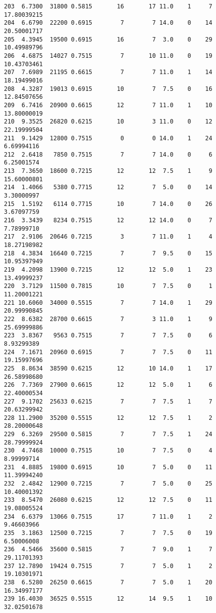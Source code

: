 \documentclass[
  letterpaper,
  DIV=11,
  numbers=noendperiod]{scrreprt}
\begin{document}
\begin{verbatim}
203  6.7300  31800 0.5815       16       17 11.0    1     7 17.80039215
204  6.6790  22200 0.6915        7        7 14.0    0    14 20.50001717
205  4.3945  19500 0.6915       16        7  3.0    0    29 10.49989796
206  4.6875  14027 0.7515        7       10 11.0    0    19 10.43703461
207  7.6989  21195 0.6615        7        7 11.0    1    14 18.19499016
208  4.3287  19013 0.6915       10        7  7.5    0    16 12.84507656
209  6.7416  20900 0.6615       12        7 11.0    1    10 13.80000019
210  9.3525  26820 0.6215       10        3 11.0    0    12 22.19999504
211  9.1429  12800 0.7515        0        0 14.0    1    24  6.69994116
212  2.6418   7850 0.7515        7        7 14.0    0     6  6.25001574
213  7.3650  18600 0.7215       12       12  7.5    1     9 15.60000801
214  1.4066   5380 0.7715       12        7  5.0    0    14  3.30000997
215  1.5192   6114 0.7715       10        7 14.0    0    26  3.67097759
216  3.3439   8234 0.7515       12       12 14.0    0     7  7.78999710
217  2.9106  20646 0.7215        3        7 11.0    1     4 18.27198982
218  4.3834  16640 0.7215        7        7  9.5    0    15 10.95397949
219  4.2098  13900 0.7215       12       12  5.0    1    23 13.49999237
220  3.7129  11500 0.7815       10        7  7.5    0     1 11.20001221
221 10.6060  34000 0.5515        7        7 14.0    1    29 20.99990845
222  8.6382  28700 0.6615        7        3 11.0    1     9 25.69999886
223  3.8367   9563 0.7515        7        7  7.5    0     6  8.93299389
224  7.1671  20960 0.6915        7        7  7.5    0    11 19.15997696
225  8.8634  38590 0.6215       12       10 14.0    1    17 26.58998680
226  7.7369  27900 0.6615       12       12  5.0    1     6 22.40000534
227  9.1702  25633 0.6215        7        7  7.5    1     7 20.63299942
228 11.2900  35200 0.5515       12       12  7.5    1     2 28.20000648
229  6.3269  29500 0.5815        7        7  7.5    1    24 28.79999924
230  4.7468  10000 0.7515       10        7  7.5    0     4  8.99999714
231  4.8885  19800 0.6915       10        7  5.0    0    11 11.39994240
232  2.4842  12900 0.7215        7        7  5.0    0    25 10.40001392
233  8.5470  26080 0.6215       12       12  7.5    0    11 19.08005524
234  6.6379  13066 0.7515       17        7 11.0    1     2  9.46603966
235  3.1863  12500 0.7215        7        7  7.5    0    19  6.50006008
236  4.5466  35600 0.5815        7        7  9.0    1     7 29.11701393
237 12.7890  19424 0.7515        7        7  5.0    1     2 19.10301971
238  6.5280  26250 0.6615        7        7  5.0    1    20 16.34997177
239 16.4030  36525 0.5515       12       14  9.5    1    10 32.02501678

\end{verbatim}
\end{document}
